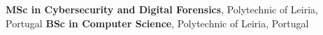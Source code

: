 %
%
%

\vspace{-1em}
\vspace{0.5em}
\begin{scholarship}
	{\textbf{MSc in Cybersecurity and Digital Forensics}, Polytechnic of Leiria, Portugal}
	{\textbf{BSc in Computer Science}, Polytechnic of Leiria, Portugal}
\end{scholarship}